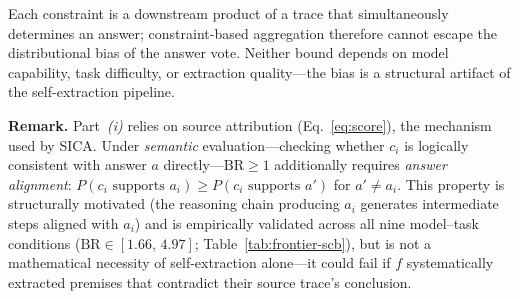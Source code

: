\medskip\noindent
Each constraint is a downstream product of a trace that simultaneously determines an answer; constraint-based aggregation therefore cannot escape the distributional bias of the answer vote.
Neither bound depends on model capability, task difficulty, or extraction quality---the bias is a structural artifact of the self-extraction pipeline.

\medskip\noindent
\textbf{Remark.}\;%
Part~\textit{(i)} relies on source attribution (Eq.~\ref{eq:score}), the mechanism used by SICA.
Under \emph{semantic} evaluation---checking whether $c_i$ is logically consistent with answer $a$ directly---$\mathrm{BR} \geq 1$ additionally requires \emph{answer alignment}: $P(c_i \text{ supports } a_i) \geq P(c_i \text{ supports } a')$ for $a' \neq a_i$.
This property is structurally motivated (the reasoning chain producing $a_i$ generates intermediate steps aligned with $a_i$) and is empirically validated across all nine model--task conditions ($\mathrm{BR} \in [1.66,\, 4.97]$; Table~\ref{tab:frontier-scb}), but is not a mathematical necessity of self-extraction alone---it could fail if $f$ systematically extracted premises that contradict their source trace's conclusion.

